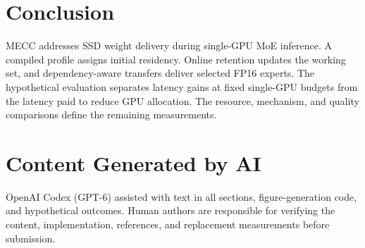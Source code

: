 \documentclass[conference,9pt,letterpaper]{IEEEtran}
\newcommand{\mecc}{\textsc{MECC}}
\begin{document}
\section{Conclusion}
\mecc{} addresses SSD weight delivery during single-GPU MoE inference. A compiled profile assigns initial residency. Online retention updates the working set, and dependency-aware transfers deliver selected FP16 experts. The hypothetical evaluation separates latency gains at fixed single-GPU budgets from the latency paid to reduce GPU allocation. The resource, mechanism, and quality comparisons define the remaining measurements.

\section*{Content Generated by AI}
OpenAI Codex (GPT-6) assisted with text in all sections, figure-generation code, and hypothetical outcomes. Human authors are responsible for verifying the content, implementation, references, and replacement measurements before submission.

\clearpage
{}


\end{document}
